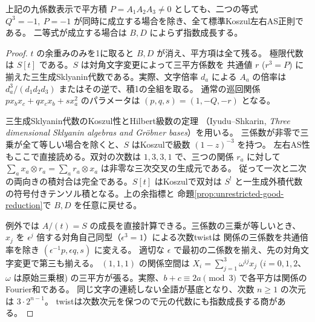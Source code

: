 \begin{proposition}\label{prop:triple-face-all-regularity}
上記の九係数表示で平方積 $P=A_1A_2A_3\ne0$ としても、二つの等式
$Q^3=-1,\ P=-1$ が同時に成立する場合を除き、全て標準Koszul左右AS正則である。
二等式が成立する場合は $B,D$ によらず指数成長する。
\end{proposition}
\begin{proof}
$t$ の余重みのみを1に取ると $B,D$ が消え、平方項は全て残る。
極限代数は $S[t]$ である。$S$ は対角文字変更によって三平方係数を
共通値 $r$ ($r^3=P$) に揃えた三生成Sklyanin代数である。実際、文字倍率
$d_a$ による $A_a$ の倍率は $d_a^3/(d_1d_2d_3)$ またはその逆で、積1の全組を取る。
通常の巡回関係 $p x_bx_c+q x_cx_b+s x_a^2$ のパラメータは $(p,q,s)=(1,-Q,-r)$ となる。

三生成Sklyanin代数のKoszul性とHilbert級数の定理
（Iyudu--Shkarin, \textit{Three dimensional Sklyanin algebras and Gr\"obner bases}）を用いる。
三係数が非零で三乗が全て等しい場合を除くと、$S$ はKoszulで級数 $(1-z)^{-3}$ を持つ。
左右AS性もここで直接読める。双対の次数は $1,3,3,1$ で、三つの関係 $r_a$ に対して
$\sum_a x_a\otimes r_a=\sum_a r_a\otimes x_a$ は非零な三次交叉の生成元である。
従って一次と二次の両向きの積対合は完全である。$S[t]$ はKoszulで双対は
$S^!$ と一生成外積代数の符号付きテンソル積となる。上の余指標と
命題\ref{prop:unrestricted-good-reduction}で $B,D$ を任意に戻せる。

例外では $A/(t)=S$ の成長を直接計算できる。三係数の三乗が等しいとき、
$x_j$ を $\epsilon^j$ 倍する対角自己同型（$\epsilon^3=1$）による次数twistは
関係の三係数を共通倍率を除き $(\epsilon^{-1}p,\epsilon q,s)$ に変える。
適切な $\epsilon$ で最初の二係数を揃え、先の対角文字変更で第三も揃える。
$(1,1,1)$ の関係空間は $X_i=\sum_{j=1}^3\omega^{ij}x_j$ ($i=0,1,2$、$\omega$ は原始三乗根)
の三平方が張る。実際、$b+c\equiv2a\pmod3$ で各平方は関係のFourier和である。
同じ文字の連続しない全語が基底となり、次数 $n\ge1$ の次元は $3\cdot2^{n-1}$。
twistは次数次元を保つので元の代数にも指数成長する商がある。
\end{proof}
